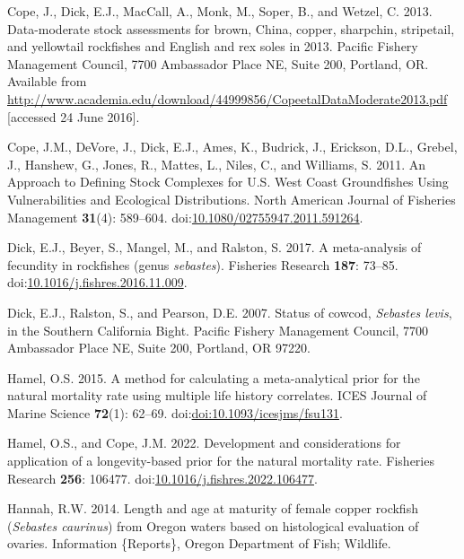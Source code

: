 \documentclass[11pt,
  english,
  letterpaper,
]{article}
\newlength{\cslhangindent}
\newenvironment{CSLReferences}[2] %
 {%
  \setlength{\parindent}{0pt}
  \ifodd #1 \everypar{\setlength{\hangindent}{\cslhangindent}}\ignorespaces\fi
  \ifnum #2 > 0
  \setlength{\parskip}{#2\baselineskip}
  \fi
 }%
 {}
\begin{document}
\begin{CSLReferences}{1}{0}
\leavevmode{}%
Cope, J., Dick, E.J., MacCall, A., Monk, M., Soper, B., and Wetzel, C. 2013. Data-moderate stock assessments for brown, {China}, copper, sharpchin, stripetail, and yellowtail rockfishes and {English} and rex soles in 2013. Pacific Fishery Management Council, 7700 Ambassador Place NE, Suite 200, Portland, OR. Available from \url{http://www.academia.edu/download/44999856/CopeetalDataModerate2013.pdf} {[}accessed 24 June 2016{]}.

\leavevmode{}%
Cope, J.M., DeVore, J., Dick, E.J., Ames, K., Budrick, J., Erickson, D.L., Grebel, J., Hanshew, G., Jones, R., Mattes, L., Niles, C., and Williams, S. 2011. An {Approach} to {Defining} {Stock} {Complexes} for {U}.{S}. {West} {Coast} {Groundfishes} {Using} {Vulnerabilities} and {Ecological} {Distributions}. North American Journal of Fisheries Management \textbf{31}(4): 589--604. doi:\href{https://doi.org/10.1080/02755947.2011.591264}{10.1080/02755947.2011.591264}.

\leavevmode{}%
Dick, E.J., Beyer, S., Mangel, M., and Ralston, S. 2017. A meta-analysis of fecundity in rockfishes (genus \emph{sebastes}). Fisheries Research \textbf{187}: 73--85. doi:\href{https://doi.org/10.1016/j.fishres.2016.11.009}{10.1016/j.fishres.2016.11.009}.

\leavevmode{}%
Dick, E.J., Ralston, S., and Pearson, D.E. 2007. Status of cowcod, \emph{{Sebastes} levis}, in the {Southern} {California} {Bight}. Pacific Fishery Management Council, 7700 Ambassador Place NE, Suite 200, Portland, OR 97220.

\leavevmode{}%
Hamel, O.S. 2015. A method for calculating a meta-analytical prior for the natural mortality rate using multiple life history correlates. ICES Journal of Marine Science \textbf{72}(1): 62--69. doi:\href{https://doi.org/doi:10.1093/icesjms/fsu131}{doi:10.1093/icesjms/fsu131}.

\leavevmode{}%
Hamel, O.S., and Cope, J.M. 2022. Development and considerations for application of a longevity-based prior for the natural mortality rate. Fisheries Research \textbf{256}: 106477. doi:\href{https://doi.org/10.1016/j.fishres.2022.106477}{10.1016/j.fishres.2022.106477}.

\leavevmode{}%
Hannah, R.W. 2014. Length and age at maturity of female copper rockfish (\emph{{Sebastes} caurinus}) from {Oregon} waters based on histological evaluation of ovaries. Information \{Reports\}, Oregon Department of Fish; Wildlife.


\end{CSLReferences}
\end{document}
